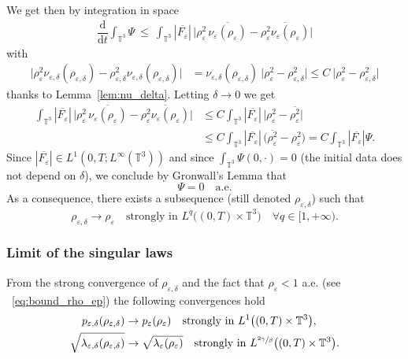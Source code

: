\documentclass[JEP,XML,SOM,Unicode,NoEqCountersInSection]{cedram}
\newcommand{\<}{\bigl\langle}
\renewcommand{\>}{\bigr\rangle}
\newcommand{\labeleq}[1]{}
\theoremstyle{definition}
\theoremstyle{remark}
\newcommand{\TT}{\mathbb{T}^3}
\newcommand{\Dt}{\dfrac{\mathrm{d}}{\mathrm{d} t}}
\let\ov\overline
\let\ep\varepsilon
\begin{document}
We get then by integration in space
\begin{align*}\labeleq{Psi2}
\Dt \int_{\TT}{\Psi}~ \leq ~ \int_{\TT}{ |\ov{ F_\ep }|\, \bigl| \rho_\ep^2 \,\ov{\nu_\ep(\rho_\ep)} - \ov{\rho_\ep^2 \nu_\ep(\rho_\ep)} \bigr|}
\end{align*}
with
\begin{align*}
\big|\rho_\ep^2 \nu_{\ep,\delta}(\rho_{\ep,\delta}) - \rho_{\ep,\delta}^2 \nu_{\ep,\delta}(\rho_{\ep,\delta})\big|
& = \nu_{\ep,\delta}(\rho_{\ep,\delta}) \ \big|\rho_{\ep}^2 - \rho_{\ep,\delta}^2 \big|
\leq C \ \big|\rho_{\ep}^2 - \rho_{\ep,\delta}^2 \big|
\end{align*}
thanks to Lemma~\ref{lem:nu_delta}.
Letting $\delta \rightarrow 0$ we get
\begin{align*}
\int_{\TT}{ |\ov{ F_\ep }|\, \bigl| \rho_\ep^2 \,\ov{\nu_\ep(\rho_\ep)} - \ov{\rho_\ep^2 \nu_\ep(\rho_\ep)} \bigr|}
& \leq C \int_{\TT}{ |\ov{ F_\ep }|\, \big|\rho_{\ep}^2 - \ov{\rho_\ep^2} \big|} \\
& \leq C \int_{\TT}{ |\ov{ F_\ep }|\, \big(\ov{\rho_{\ep}^2} - \rho_\ep^2 \big)}
= C \int_{\TT}{|\ov{ F_\ep }|\Psi}.
\end{align*}
Since $|\ov{F_\ep}| \in L^1(0,T;L^\infty(\TT))$ and since $\displaystyle \int_{\TT}{\Psi(0,\cdot)} = 0$ (the initial data does not depend on $\delta$),
we conclude by Gronwall's Lemma that
\[
\Psi = 0 \quad \text{a.e.}
\]
As a consequence, there exists a subsequence (still denoted $\rho_{\ep,\delta}$) such that
\begin{equation*}
\rho_{\ep,\delta} \to \rho_\ep \quad \text{strongly in } L^q\big((0,T) \times \TT\big) \quad\forall q \in [1, +\infty).
\end{equation*}

\subsubsection*{Limit of the singular laws}
From the strong convergence of $\rho_{\ep,\delta}$ and the fact that $\rho_\ep < 1$ a.e. (see ~\eqref{eq:bound_rho_ep}) the following convergences hold
\begin{align*}
p_{\ep,\delta}(\rho_{\ep,\delta}) &\to p_\ep(\rho_\ep) \quad \text{strongly in } L^{1}\big((0,T)\times \TT\big),\\
\sqrt{\lambda_{\ep,\delta}(\rho_{\ep,\delta})}&\to \sqrt{\lambda_\ep(\rho_\ep)} \quad \text{strongly in } L^{\sfrac{2\gamma}{\beta}}\big((0,T)\times \TT\big).
\end{align*}
\end{document}
